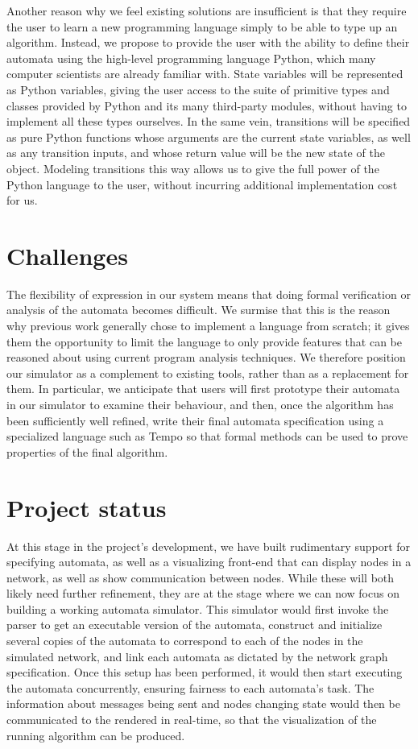 \documentclass{scrartcl}
\begin{document}
Another reason why we feel existing solutions are insufficient is that they
require the user to learn a new programming language simply to be able to type
up an algorithm. Instead, we propose to provide the user with the ability to
define their automata using the high-level programming language Python, which
many computer scientists are already familiar with. State variables will be
represented as Python variables, giving the user access to the suite of
primitive types and classes provided by Python and its many third-party
modules, without having to implement all these types ourselves. In the same
vein, transitions will be specified as pure Python functions whose arguments
are the current state variables, as well as any transition inputs, and whose
return value will be the new state of the object. Modeling transitions this way
allows us to give the full power of the Python language to the user, without
incurring additional implementation cost for us.

\section{Challenges}

The flexibility of expression in our system means that doing formal verification
or analysis of the automata becomes difficult. We surmise that this is the
reason why previous work generally chose to implement a language from scratch;
it gives them the opportunity to limit the language to only provide features
that can be reasoned about using current program analysis techniques. We
therefore position our simulator as a complement to existing tools, rather than
as a replacement for them. In particular, we anticipate that users will first
prototype their automata in our simulator to examine their behaviour, and then,
once the algorithm has been sufficiently well refined, write their final
automata specification using a specialized language such as Tempo so that
formal methods can be used to prove properties of the final algorithm.

\section{Project status}

At this stage in the project's development, we have built rudimentary support
for specifying automata, as well as a visualizing front-end that can display
nodes in a network, as well as show communication between nodes. While these
will both likely need further refinement, they are at the stage where we can
now focus on building a working automata simulator. This simulator would first
invoke the parser to get an executable version of the automata, construct and
initialize several copies of the automata to correspond to each of the nodes in
the simulated network, and link each automata as dictated by the network graph
specification. Once this setup has been performed, it would then start
executing the automata concurrently, ensuring fairness to each automata's task.
The information about messages being sent and nodes changing state would then
be communicated to the rendered in real-time, so that the visualization of the
running algorithm can be produced.
\end{document}
